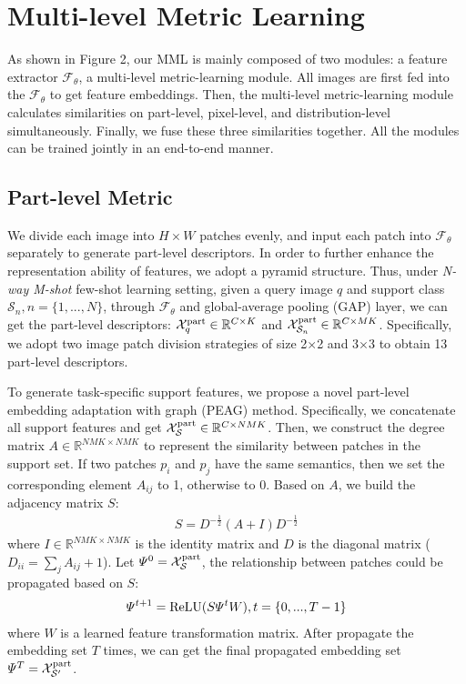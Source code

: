 \documentclass{article}
\begin{document}
\section{Multi-level Metric Learning}
As shown in Figure 2, our MML is mainly composed of two modules: a feature extractor $\mathcal{F}_{\theta}$, a multi-level metric-learning module. All images are first fed into the $\mathcal{F}_{\theta}$ to get feature embeddings. Then, the multi-level metric-learning module calculates similarities on part-level, pixel-level, and distribution-level simultaneously. Finally, we fuse these three similarities together. All the modules can be trained jointly in an end-to-end manner.
\subsection{Part-level Metric}
We divide each image into $H\times W$ patches evenly, and input each patch into $\mathcal{F}_{\theta}$ separately to generate part-level descriptors. In order to further enhance the representation ability of features, we adopt a pyramid structure. Thus, under \emph{N-way M-shot} few-shot learning setting, given a query image $q$ and support class $\mathcal{S}_n, n=\{1, ..., N\}$, through $\mathcal{F}_{\theta}$ and global-average pooling (GAP) layer, we can get the part-level descriptors:
$\mathcal{X}^{\rm part}_q\in\mathbb{R}^{C\times K}$ and $\mathcal{X}^{\rm part}_{\mathcal{S}_n}\in\mathbb{R}^{C\times MK}$. Specifically, we adopt two image patch division strategies of size 2$\times$2 and 3$\times$3 to obtain 13 part-level descriptors.  

To generate task-specific support features, we propose a novel part-level embedding adaptation with graph (PEAG) method. Specifically, we concatenate all support features and get $\mathcal{X}^{\rm part}_{\mathcal{S}}\in\mathbb{R}^{C\times NMK}$. Then, we construct the degree matrix $A\in\mathbb{R}^{NMK\times NMK}$ to represent the similarity between patches in the support set.
If two patches $p_i$ and $p_j$ have the same semantics, then we set the corresponding element $A_{ij}$ to 1, otherwise to 0. Based on $A$, we build the adjacency matrix $S$:
\begin{gather}
	S=D^{-\frac{1}{2}}(A+I)D^{-\frac{1}{2}}
\end{gather}
where $I\in\mathbb{R}^{NMK\times NMK}$ is the identity matrix and $D$ is the diagonal matrix ($D_{ii}=\sum_{j}A_{ij}+1$). Let $\varPsi^0=\mathcal{X}^{\rm part}_{\mathcal{S}}$, the relationship between patches could be propagated based on $S$:
\begin{gather}
	\varPsi^{t+1}={\rm ReLU}(S\varPsi^{t}W), t=\{0,...,T-1\}
\end{gather}
where $W$ is a learned feature transformation matrix. After propagate the embedding set $T$ times, we can get the final propagated embedding set $\varPsi^{T} = \mathcal{X}^{\rm part}_{\mathcal{S}'}$.
\end{document}
